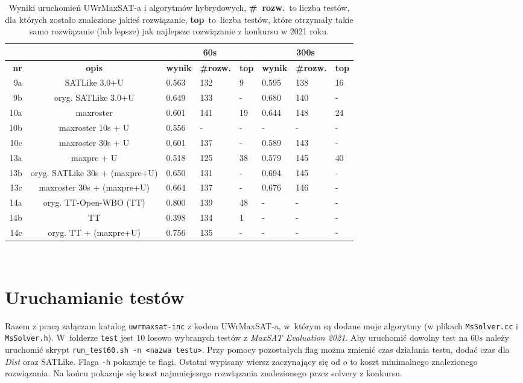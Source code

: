 \documentclass[shortabstract]{iithesis}
\begin{document}
\begin{table}[h]
	\centering
	\begin{tabular}{|r|c|p{1.1cm}|p{1.5cm}|p{1cm}|p{1.1cm}|p{1.5cm}|p{1cm}|}
		\hline
		& & \multicolumn{3}{|c|}{60s} & \multicolumn{3}{|c|}{300s} \\
		\hline
		\textbf{nr} & \textbf{opis} & \textbf{wynik} & \textbf{\#rozw.} & \textbf{top} & \textbf{wynik} & \textbf{\#rozw.} & \textbf{top} \\
		\hline
		9a & SATLike 3.0+U & 0.563 & 132 & 9 & 0.595 & 138 & 16 \\
		\hline		
		9b & oryg. SATLike 3.0+U & 0.649 & 133 & - & 0.680 & 140 & - \\
		\hline		
		10a & maxroster & 0.601 & 141 & 19 & 0.644 & 148 & 24 \\
		\hline		
		10b & maxroster 10s + U & 0.556 & - & - & - & - & - \\
		\hline		
		10c & maxroster 30s + U & 0.601 & 137 & - & 0.589 & 143 & - \\
		\hline		
		13a & maxpre + U & 0.518 & 125 & 38 & 0.579 & 145 & 40 \\
		\hline
		13b & oryg. SATLike 30s + (maxpre+U) & 0.650 & 131 & - & 0.694 & 145 & - \\
		\hline
		13c & maxroster 30s + (maxpre+U) & 0.664 & 137 & - & 0.676 & 146 & - \\
		\hline
		14a & oryg. TT-Open-WBO (TT) & 0.800 & 139 & 48 & - & - & - \\
		\hline
		14b & TT & 0.398 & 134 & 1 & - & - & - \\
		\hline
		14c & oryg. TT + (maxpre+U) & 0.756 & 135 & - & - & - & - \\
		\hline
	\end{tabular} \\
	\label{eksperymenty2}
	\caption{Wyniki uruchomień UWrMaxSAT-a i algorytmów hybrydowych, \textbf{\#~rozw.}~to liczba testów, dla których zostało znalezione jakieś rozwiązanie, \textbf{top}~to~liczba testów, które otrzymały takie samo rozwiązanie (lub lepsze) jak najlepsze rozwiązanie z konkursu w 2021 roku.}
\end{table}

\chapter{Uruchamianie testów} \label{testing}
Razem z pracą załączam katalog \texttt{uwrmaxsat-inc} z kodem UWrMaxSAT-a, w~którym są dodane moje algorytmy (w plikach \texttt{MsSolver.cc} i \texttt{MsSolver.h}). W~folderze \texttt{test} jest $10$ losowo wybranych testów z \textit{MaxSAT Evaluation 2021}. Aby uruchomić dowolny test na $60s$ należy uruchomić skrypt \texttt{run\_test60.sh -n <nazwa testu>}.
Przy pomocy pozostałych flag można zmienić czas działania testu, dodać czas dla \textit{Dist} oraz SATLike. Flaga \texttt{-h} pokazuje te flagi. Ostatni wypisany wiersz zaczynający się od $o$ to koszt minimalnego znalezionego rozwiązania. Na końcu pokazuje się koszt najmniejszego rozwiązania znalezionego przez solvery z konkursu.
\end{document}
